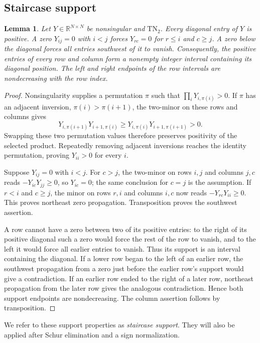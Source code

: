 \documentclass[11pt]{article}
\newtheorem{lemma}[theorem]{Lemma}
\theoremstyle{definition}
\theoremstyle{remark}
\numberwithin{equation}{section}
\newcommand{\R}{\mathbb R}
\begin{document}
\subsection{Staircase support}

\begin{lemma}\label{lem:staircase}
Let $Y\in\R^{N\times N}$ be nonsingular and $\mathrm{TN}_2$.
Every diagonal entry of $Y$ is positive. A zero $Y_{ij}=0$ with $i<j$
forces $Y_{rc}=0$ for $r\leq i$ and $c\geq j$. A zero below the
diagonal forces all entries southwest of it to vanish. Consequently,
the positive entries of every row and column form a nonempty integer
interval containing its diagonal position. The left and right endpoints
of the row intervals are nondecreasing with the row index.
\end{lemma}

\begin{proof}
Nonsingularity supplies a permutation $\pi$ such that
$\prod_iY_{i,\pi(i)}>0$. If $\pi$ has an adjacent inversion,
$\pi(i)>\pi(i+1)$, the two-minor on these rows and columns gives
\[
 Y_{i,\pi(i+1)}Y_{i+1,\pi(i)}
 \geq Y_{i,\pi(i)}Y_{i+1,\pi(i+1)}>0.
\]
Swapping these two permutation values therefore preserves positivity
of the selected product. Repeatedly removing adjacent inversions
reaches the identity permutation, proving $Y_{ii}>0$ for every $i$.

Suppose $Y_{ij}=0$ with $i<j$. For $c>j$, the two-minor on rows
$i,j$ and columns $j,c$ reads
$-Y_{ic}Y_{jj}\geq0$, so $Y_{ic}=0$; the same conclusion for
$c=j$ is the assumption. If $r<i$ and $c\geq j$, the minor on
rows $r,i$ and columns $i,c$ now reads
$-Y_{rc}Y_{ii}\geq0$. This proves northeast zero propagation.
Transposition proves the southwest assertion.

A row cannot have a zero between two of its positive entries: to the
right of its positive diagonal such a zero would force the rest of the
row to vanish, and to the left it would force all earlier entries to
vanish. Thus its support is an interval containing the diagonal.
If a lower row began to the left of an earlier row, the southwest
propagation from a zero just before the earlier row's support would
give a contradiction. If an earlier row ended to the right of a later
row, northeast propagation from the later row gives the analogous
contradiction. Hence both support endpoints are nondecreasing.
The column assertion follows by transposition.
\end{proof}

We refer to these support properties as \emph{staircase support}.
They will also be applied after Schur elimination and a sign
normalization.
\end{document}
